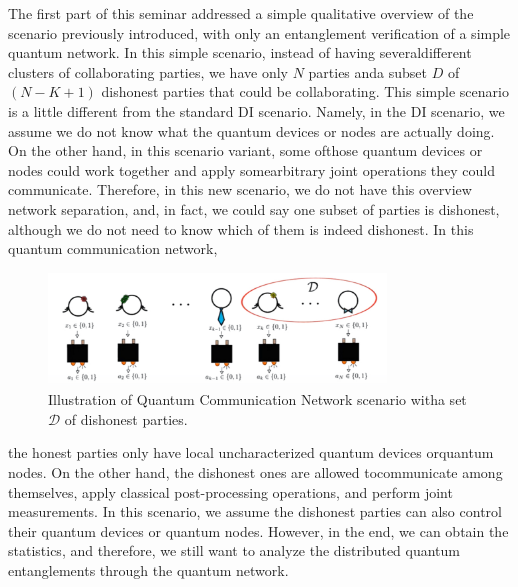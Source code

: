 \documentclass[12pt]{article}
\begin{document}
    The first part of this seminar addressed a simple qualitative overview of the scenario previously introduced, with only an entanglement verification of a simple quantum network. In this simple scenario, instead of having several\break different clusters of collaborating parties, we have only $N$ parties and\break a subset $D$ of $(N - K + 1)$ dishonest parties that could be collaborating. This simple scenario is a little different from the standard DI scenario. Namely, in the DI scenario, we assume we do not know what the quantum devices or nodes are actually doing. On the other hand, in this scenario variant, some of\break those quantum devices or nodes could work together and apply some\break arbitrary joint operations they could communicate. Therefore, in this new scenario, we do not have this overview network separation, and, in fact, we could say one subset of parties is dishonest, although we do not need to know which of them is indeed dishonest. In this quantum communication network,\break
    \vspace{-3ex}
    \begin{figure}[ht]
        \centering
        \includegraphics[width=0.8\textwidth]{figures/images/img-2.pdf}
        \caption{\centering Illustration of Quantum Communication Network scenario with\break a set $\mathcal{D}$ of dishonest parties.}
    \end{figure}

    \clearpage
    
    \noindent the honest parties only have local uncharacterized quantum devices or\break quantum nodes. On the other hand, the dishonest ones are allowed to\break communicate among themselves, apply classical post-processing operations, and perform joint measurements. In this scenario, we assume the dishonest parties can also control their quantum devices or quantum nodes. However, in the end, we can obtain the statistics, and therefore, we still want to analyze the distributed quantum entanglements through the quantum network.
\end{document}
